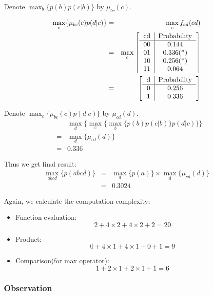 \documentclass[11pt,a4paper]{article}
\begin{document}
Denote $\max_{b} \{p(b)p(c|b) \}$ by $\mu_{bc}(c)$. 

\begin{eqnarray}
	\max_{c} \{\mu_{bc}(c) p(d|c)\} &=& 
	\max_{c} f_{cd}(cd) \\
&=&\max_{c} \left[ 
\begin{tabular}{c|c}
cd & Probability \\
\hline
00 & 0.144 \\
01 & 0.336(*) \\
10 & 0.256(*) \\ 
11 & 0.064 \\
\end{tabular} \right] \\
&=&\left[ 
\begin{tabular}{c|c}
d & Probability \\
\hline
0 & 0.256 \\ 
1 & 0.336 
\end{tabular} \right]
\end{eqnarray}

Denote $\max_{c} \{\mu_{bc}(c) p(d|c)\}$ by $\mu_{cd}(d)$. 
\begin{eqnarray}
&& \max_{d} \{ \max_{c} \{\max_{b} \{p(b)p(c|b) \} p(d|c)\} \}  \\
&=& \max_{d}\{\mu_{cd}(d)\} \\
&=& 0.336 
\end{eqnarray}

Thus we get final result:
\begin{eqnarray}
\max_{abcd} \{ p(abcd) \} &=& \max_{a} \{ p(a) \} \times \max_{d}\{\mu_{cd}(d)\} \\
&=& 0.3024 
\end{eqnarray}

Again, we calculate the computation complexity:
\begin{itemize}
	\item Function evaluation: 
	$$
	2 + 4 \times 2 + 4 \times 2 + 2 = 20
	$$
	\item Product: 
	$$
	0 + 4 \times 1 + 4 \times 1 + 0 + 1 = 9
	$$
	\item Comparison(for max operator): 
	$$
	1 + 2 \times 1 + 2 \times 1 + 1 = 6
	$$
\end{itemize}

\subsubsection{Observation}
\end{document}
